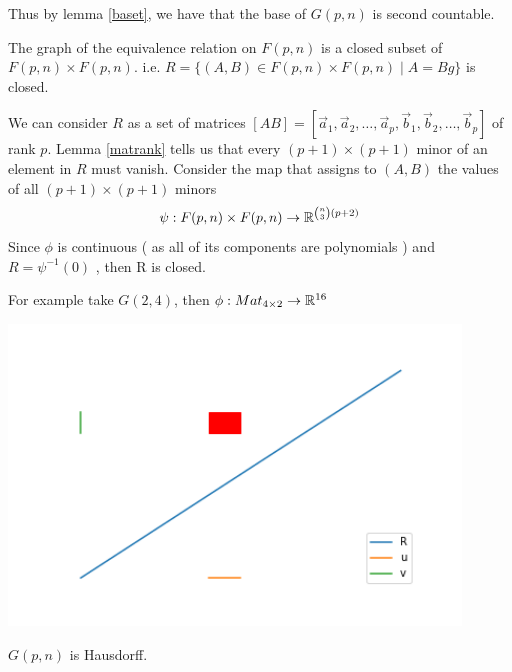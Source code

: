 \documentclass[11pt,a4paper]{report}
\begin{document}
Thus by lemma \ref{baset}, we have that the base of $G(p,n)$ is second countable.
\begin{Prop}
The graph of the equivalence relation on $F(p,n)$ is a closed subset of $F(p,n) \times F(p,n)$. i.e. $ R = \{ (A,B) \in F(p,n) \times F(p,n) \; | \; A = Bg \}$ is closed.
\end{Prop}
We can consider $R$ as a set of matrices $[A B] = [\vec{a}_1, \vec{a}_2, \dots, \vec{a}_p, \vec{b}_1, \vec{b}_2, \dots , \vec{b}_p]$ of rank $p$.
Lemma \ref{matrank} tells us that every $(p+1) \times (p+1) $ minor of an element in $R$ must vanish. Consider the map that assigns to $(A,B)$ the values of all $ (p+1) \times (p+1) $ minors
$$ \psi:  F(p,n) \times F(p,n) \to \mathbb{R}^{ {n \choose 3} (p+2) }$$
Since $\phi$ is continuous ( as all of its components are polynomials )  and $R = \psi^{-1} (0) $ , then R is closed.
\begin{Ex}
    For example take $G(2,4)$, then $\phi: Mat_{4 \times 2} \to \mathbb{R}^{16}$ 
\end{Ex}
\begin{center}
      \centering
      \includegraphics[width=0.90\textwidth]{graph_int.png}
\end{center}

\begin{Prop}
$G(p,n)$ is Hausdorff.
\end{Prop}
\end{document}
